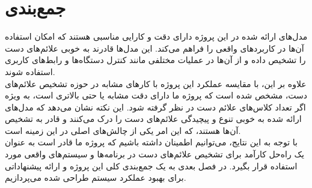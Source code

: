 \pagebreak


\section{جمع‌بندی}
مدل‌های ارائه شده در این پروژه دارای دقت و کارایی مناسبی هستند که امکان استفاده آن‌ها در کاربردهای واقعی را فراهم می‌کند. این مدل‌ها قادرند به خوبی علائم‌های دست را تشخیص داده و از آن‌ها در عملیات مختلفی مانند کنترل دستگاه‌ها و رابط‌های کاربری استفاده شوند.
\\
علاوه بر این، با مقایسه عملکرد  این پروژه با کارهای مشابه در حوزه تشخیص علائم‌های دست، مشخص شده است که پروژه ما دارای دقت مشابه یا حتی بالاتری است، به ویژه اگر تعداد کلاس‌های علائم دست در نظر گرفته شود. این نکته نشان می‌دهد که مدل‌های ارائه شده به خوبی تنوع و پیچیدگی علائم‌های دست را درک می‌کنند و قادر به تشخیص آن‌ها هستند، که این امر یکی از چالش‌های اصلی در این زمینه است.
\\
با توجه به این نتایج، می‌توانیم اطمینان داشته باشیم که پروژه ما قادر است به عنوان یک راه‌حل کارآمد برای تشخیص علائم‌های دست در برنامه‌ها و سیستم‌های واقعی مورد استفاده قرار بگیرد.
در فصل بعدی به یک جمع‌بندی کلی این پروژه و ارائه پیشنهاداتی برای بهبود عملکرد سیستم طراحی شده می‌پردازیم.

